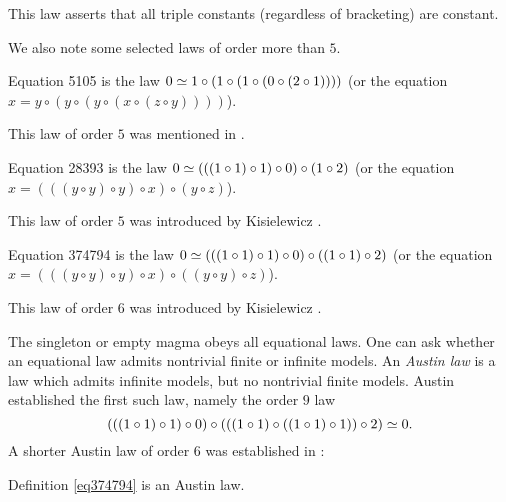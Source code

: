 This law asserts that all triple constants (regardless of bracketing) are constant.

We also note some selected laws of order more than $5$.

\begin{definition}[Equation 5105]
  \label{eq5105}
  Equation 5105 is the law $0  \simeq 1 \circ (1 \circ (1 \circ (0 \circ (2 \circ 1))))$ (or the equation $x = y \circ (y \circ (y \circ (x \circ (z \circ y))))$).
\end{definition}

This law of order $5$ was mentioned in \cite{Kisielewicz2}.

\begin{definition}[Equation 28393]
  \label{eq28393}
  Equation 28393 is the law $0  \simeq  (((1 \circ 1) \circ 1) \circ 0) \circ (1 \circ 2)$ (or the equation $x = (((y \circ y) \circ y) \circ x) \circ (y \circ z)$).
\end{definition}

This law of order $5$ was introduced by Kisielewicz \cite{Kisielewicz}.

\begin{definition}[Equation 374794]
  \leanok
  \label{eq374794}
  Equation 374794 is the law $0  \simeq  (((1 \circ 1) \circ 1) \circ 0) \circ ((1 \circ 1) \circ 2)$ (or the equation $x = (((y \circ y) \circ y) \circ x) \circ ((y \circ y) \circ z)$).
\end{definition}

This law of order $6$ was introduced by Kisielewicz \cite{Kisielewicz}.

The singleton or empty magma obeys all equational laws.  One can ask whether an equational law admits nontrivial finite or infinite models.  An \emph{Austin law} is a law which admits infinite models, but no nontrivial finite models.  Austin \cite{austin} established the first such law, namely the order $9$ law
$$ (((1 \circ 1) \circ 1) \circ 0) \circ (((1 \circ 1) \circ ((1 \circ 1) \circ 1)) \circ 2) \simeq 0.$$
A shorter Austin law of order $6$ was established in \cite{Kisielewicz}:

\begin{theorem}
  \leanok
  \label{kis-thm}
  Definition \ref{eq374794} is an Austin law.
\end{theorem}

